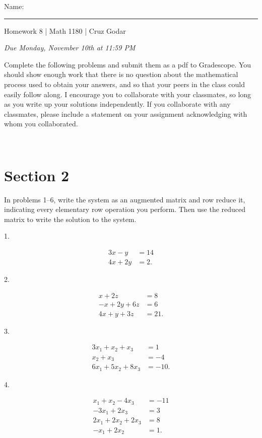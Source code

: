 \documentclass{article}
\begin{document}
\Large Name: \rule{2in}{0.15mm} \hfill Homework 8 | Math 1180 | Cruz Godar \vspace{4pt} \normalsize

\textit{Due Monday, November 10th at 11:59 PM}

Complete the following problems and submit them as a pdf to Gradescope. You should show enough work that there is no question about the mathematical process used to obtain your answers, and so that your peers in the class could easily follow along. I encourage you to collaborate with your classmates, so long as you write up your solutions independently. If you collaborate with any classmates, please include a statement on your assignment acknowledging with whom you collaborated.

~\\

\section{Section 2}

In problems 1--6, write the system as an augmented matrix and row reduce it, indicating every elementary row operation you perform. Then use the reduced matrix to write the solution to the system.

1.

\begin{align*}
	3x - y &= 14\\
	4x + 2y &= 2.
\end{align*}

2.

\begin{align*}
	x + 2z &= 8\\
	-x + 2y + 6z &= 6\\
	4x + y + 3z &= 21.
\end{align*}

3.

\begin{align*}
	3x_1 + x_2 + x_3 &= 1\\
	x_2 + x_3 &= -4\\
	6x_1 + 5x_2 + 8x_3 &= -10.
\end{align*}

4.

\begin{align*}
	x_1 + x_2 - 4x_3 &= -11\\
	-3x_1 + 2x_3 &= 3\\
	2x_1 + 2x_2 + 2x_3 &= 8\\
	-x_1 + 2x_2 &= 1.
\end{align*}
\end{document}
